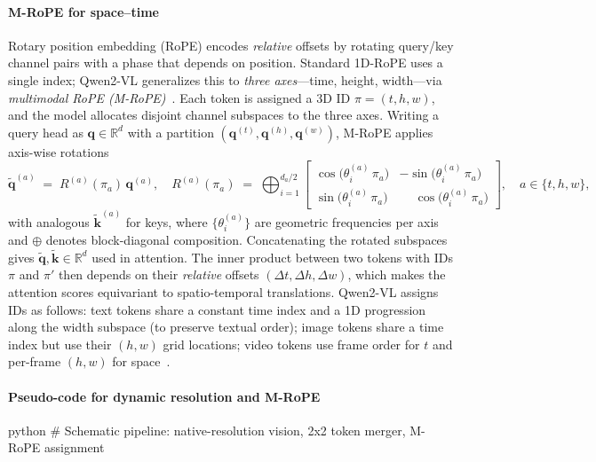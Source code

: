 \begin{enrichment}
\begin{enrichment}
        \paragraph{M\mbox{-}RoPE for space--time}
        Rotary position embedding (RoPE) encodes \emph{relative} offsets by rotating query/key channel pairs with a phase that depends on position. Standard 1D\mbox{-}RoPE uses a single index; Qwen2\mbox{-}VL generalizes this to \emph{three axes}—time, height, width—via \emph{multimodal RoPE (M\mbox{-}RoPE)}~\cite{wang2024_qwen2vl}. Each token is assigned a 3D ID $\pi\!=\!(t,h,w)$, and the model allocates disjoint channel subspaces to the three axes. Writing a query head as $\mathbf{q}\!\in\!\mathbb{R}^{d}$ with a partition $(\mathbf{q}^{(t)},\mathbf{q}^{(h)},\mathbf{q}^{(w)})$, M\mbox{-}RoPE applies axis\mbox{-}wise rotations
        \[
        \widetilde{\mathbf{q}}^{(a)} \;=\; R^{(a)}(\pi_a)\,\mathbf{q}^{(a)},\quad
        R^{(a)}(\pi_a)\;=\;\bigoplus_{i=1}^{d_a/2}
        \begin{bmatrix}
            \cos\!\big(\theta^{(a)}_i\,\pi_a\big) & -\sin\!\big(\theta^{(a)}_i\,\pi_a\big)\\[2pt]
            \sin\!\big(\theta^{(a)}_i\,\pi_a\big) & \phantom{-}\cos\!\big(\theta^{(a)}_i\,\pi_a\big)
        \end{bmatrix},
        \quad a\in\{t,h,w\},
        \]
        with analogous $\widetilde{\mathbf{k}}^{(a)}$ for keys, where $\{\theta^{(a)}_i\}$ are geometric frequencies per axis and $\oplus$ denotes block\mbox{-}diagonal composition. Concatenating the rotated subspaces gives $\widetilde{\mathbf{q}},\widetilde{\mathbf{k}}\!\in\!\mathbb{R}^{d}$ used in attention. The inner product between two tokens with IDs $\pi$ and $\pi'$ then depends on their \emph{relative} offsets $(\Delta t,\Delta h,\Delta w)$, which makes the attention scores equivariant to spatio\mbox{-}temporal translations. Qwen2\mbox{-}VL assigns IDs as follows: text tokens share a constant time index and a 1D progression along the width subspace (to preserve textual order); image tokens share a time index but use their $(h,w)$ grid locations; video tokens use frame order for $t$ and per\mbox{-}frame $(h,w)$ for space~\cite{wang2024_qwen2vl}.
        
        \newpage
        
        \paragraph{Pseudo\mbox{-}code for dynamic resolution and M\mbox{-}RoPE}
        \begin{mintedbox}{python}
            # Schematic pipeline: native-resolution vision, 2x2 token merger, M-RoPE assignment
            

\end{mintedbox}
\end{enrichment}
\end{enrichment}
